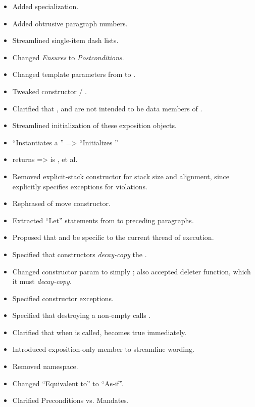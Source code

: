 \begin{itemize}
    \item Added  specialization.
    \item Added obtrusive paragraph numbers.
    \item Streamlined single-item dash lists.
    \item Changed \textit{Ensures} to \textit{Postconditions}.
    \item Changed template parameters from  to .
    \item Tweaked constructor \precond / \mandates.
    \item Clarified that , 
          and  are not intended to be data members
          of \fiber.
    \item Streamlined initialization of these exposition objects.
    \item ``Instantiates a \fiber'' => ``Initializes ''
    \item \emptyfn returns \true => \emptyfn is \true, et al.
    \item Removed explicit-stack constructor \precond for stack size and
          alignment, since \except explicitly specifies exceptions for
          violations.
    \item Rephrased \effects of move constructor.
    \item Extracted ``Let'' statements from \effects to preceding paragraphs.
\end{itemize}


\begin{itemize}
    \item Proposed that 
          and  be specific to the current thread of
          execution.
    \item Specified that constructors \emph{decay-copy} the \entryfn.
    \item Changed  constructor param to
          simply ; also accepted deleter function, which it
          must \emph{decay-copy}.
    \item Specified constructor exceptions.
    \item Specified that destroying a non-empty \fiber
          calls .
    \item Clarified that when \resumewith is called, \emptyfn becomes
          true immediately.
    \item Introduced exposition-only  member to
          streamline wording.
    \item Removed  namespace.
    \item Changed ``Equivalent to'' to ``As-if''.
    \item Clarified Preconditions vs. Mandates.
\end{itemize}

